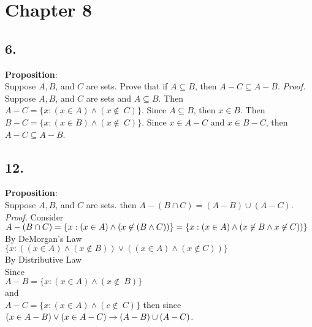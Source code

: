 \documentclass[12pt]{article}
\begin{document}
\begin{minipage}[t]{0.40\textwidth}
	
	
	
\section*{Chapter 8}
\subsection*{6.}
\textbf{Proposition}:  \\Suppose $ A,B $, and $ C $ are sets. Prove that if $ A\subseteq B $, then $ A-C\subseteq A-B $.
\newline\textit{Proof.} Suppose $ A,B $, and $ C $ are sets and $ A\subseteq B $. Then \\$ A-C=\{x:(x\in A)\land(x\not\in\ C)\} $. Since $ A\subseteq B $, then $ x\in B $. Then $ B-C=\{x:(x\in B)\land(x\not\in\ C)\} $. Since $ x\in A-C $ and $ x\in B-C $, then $ A-C\subseteq A-B $. 	

\subsection*{12.}
\textbf{Proposition}:  \\Suppose $ A,B $, and $ C $ are sets. then $ A-(B\cap C)=(A-B)\cup(A-C) $.
\newline\textit{Proof.} Consider $ A-(B\cap C)\\= \{x:(x\in A)\land(x\not\in(B\land C))\}\\=\{x:(x\in A)\land(x\not\in B\land x\not\in C))\}$\\By DeMorgan's Law\\$ \{x:((x\in A)\land (x\not\in B))\lor ((x\in A)\land (x\not\in C))\} $\\By Distributive Law\\ Since \\$ A-B=\{x:(x\in A)\land(x\not\in\ B)\} $\\and\\ $ A-C=\{x:(x\in A)\land(c\not\in\ C)\} $ then since $ (x\in A-B) \lor (x\in A-C)\\\rightarrow (A-B)\cup (A-C)$.    

\end{minipage}
\hfill\vline\hfill
\end{document}
